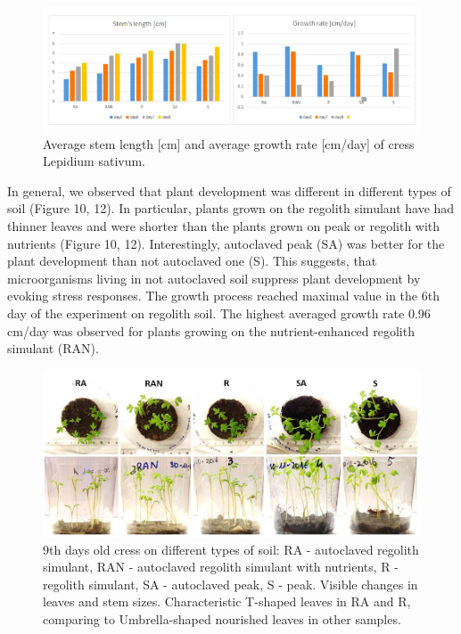 \documentclass[preprint]{elsarticle}
\begin{document}
\begin{figure}
\centering
\includegraphics{img/figure11.png}
\caption{Average stem length [cm] and average growth rate [cm/day] of cress Lepidium sativum.}
\label{fig:f11}
\end{figure}

In general, we observed that plant development was different in different types of soil (Figure 10, 12). In particular, plants grown on the regolith simulant have had thinner leaves and were shorter than the plants grown on peak or regolith with nutrients (Figure 10, 12). Interestingly, autoclaved peak (SA) was better for the plant development than not autoclaved one (S). This suggests, that microorganisms living in not autoclaved soil suppress plant development by evoking stress responses. The growth process reached maximal value in the 6th day of the experiment on regolith soil. The highest averaged growth rate 0.96 cm/day was observed for plants growing on the nutrient-enhanced regolith simulant (RAN).

\begin{figure}
\centering
\includegraphics{img/figure12.png}
\caption{9th days old cress on different types of soil: RA - autoclaved regolith simulant, RAN - autoclaved regolith simulant with nutrients, R - regolith simulant, SA - autoclaved peak, S - peak. Visible changes in leaves and stem sizes. Characteristic T-shaped leaves in RA and R, comparing to Umbrella-shaped nourished leaves in other samples.}
\label{fig:f12}
\end{figure}
\end{document}
